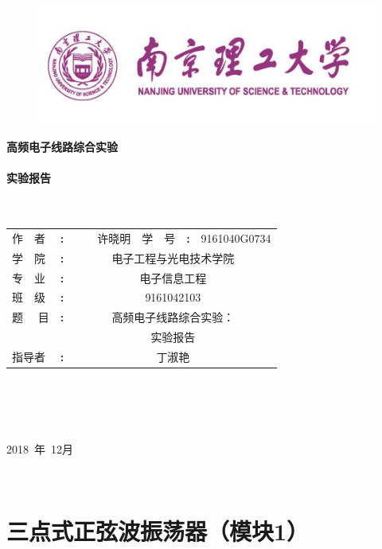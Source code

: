 \documentclass[12pt]{article}%
\author{}
\date{}
\numberwithin{equation}{section}
\begin{document}
\begin{figure}[h]
  \centering
  \includegraphics[width=.6\textwidth]{image0011.png} 
\end{figure}
\thispagestyle{empty}
\begin{center}
\begin{songti}
\textbf{高频电子线路综合实验}\\ 
\ \\ \textbf{实验报告}\\\ \\\ 
\renewcommand\arraystretch{1.5}
\begin{tabular}{p{1.7cm}p{0.2cm}p{3.5cm}p{1.7cm}p{0.2cm}p{3.5cm}}
作\ \  者&\textbf{:}&\ \ \ \ 许晓明&学\  \ 号&\textbf{:}&9161040G0734\\\cline{3-3}\cline{6-6}
学\  \ 院&\textbf{:}&\multicolumn{4}{c}{电子工程与光电技术学院}\\\cline{3-6}
专\ \ 业&\textbf{:}&\multicolumn{4}{c}{电子信息工程}\\\cline{3-6}
班\ \ 级&\textbf{:}&\multicolumn{4}{c}{9161042103}\\\cline{3-6}
题 \ \ 目&\textbf{:}&\multicolumn{4}{c}{高频电子线路综合实验：}\\\cline{3-6}
&&\multicolumn{4}{c}{实验报告}\\\cline{3-6}
指导者&\textbf{:}&\multicolumn{4}{c}{丁淑艳} \\ \cline{3-6}
\end{tabular}\\
\ \\
\ \\
\ \\
2018\ 年\ 12月
\end{songti}
\end{center}
\newpage
\ \thispagestyle{empty}
\newpage
{}
\newpage
\setcounter{page}{1}
\tableofcontents

\newpage
\setcounter{page}{1}


\section{三点式正弦波振荡器（模块1）}
\end{document}
